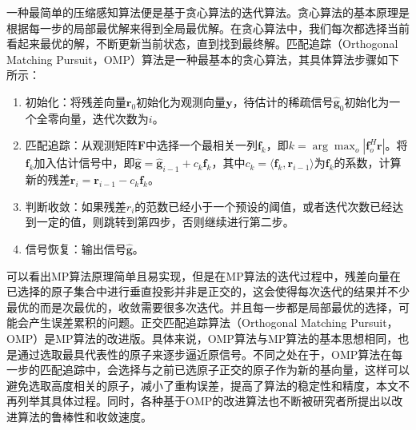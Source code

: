 \documentclass{xdupgthesis}
\begin{document}
一种最简单的压缩感知算法便是基于贪心算法的迭代算法。贪心算法的基本原理是根据每一步的局部最优解来得到全局最优解。在贪心算法中，我们每次都选择当前看起来最优的解，不断更新当前状态，直到找到最终解。匹配追踪（Orthogonal Matching Pursuit，OMP）算法是一种最基本的贪心算法，其具体算法步骤如下所示：
\begin{enumerate}
	\item 初始化：将残差向量$\mathbf{r}_0$初始化为观测向量$\mathbf{y}$，待估计的稀疏信号$\hat{\mathbf{g}}_0$初始化为一个全零向量，迭代次数为$i$。
	\item 匹配追踪：从观测矩阵$\mathbf{F}$中选择一个最相关一列$\mathbf{f}_k$，即$k = \arg \max_o |\mathbf{f}_o^H \mathbf{r}|$。将$\mathbf{f}_k$加入估计信号中，即$\hat{\mathbf{g}} = \hat{\mathbf{g}}_{i-1} + c_k \mathbf{f}_k$，其中$c_k = \langle \mathbf{f}_k, \mathbf{r}_{i-1} \rangle$为$\mathbf{f}_k$的系数，计算新的残差$\mathbf{r}_i = \mathbf{r}_{i-1} - c_k \mathbf{f}_k$。
	\item 判断收敛：如果残差$r_i$的范数已经小于一个预设的阈值，或者迭代次数已经达到一定的值，则跳转到第四步，否则继续进行第二步。
	\item 信号恢复：输出信号$\hat{\mathbf{g}}$。
\end{enumerate}
可以看出MP算法原理简单且易实现，但是在MP算法的迭代过程中，残差向量在已选择的原子集合中进行垂直投影并非是正交的，这会使得每次迭代的结果并不少最优的而是次最优的，收敛需要很多次迭代。并且每一步都是局部最优的选择，可能会产生误差累积的问题。正交匹配追踪算法（Orthogonal Matching Pursuit，OMP）是MP算法的改进版\parencite{OMP}。具体来说，OMP算法与MP算法的基本思想相同，也是通过选取最具代表性的原子来逐步逼近原信号。不同之处在于，OMP算法在每一步的匹配追踪中，会选择与之前已选原子正交的原子作为新的基向量，这样可以避免选取高度相关的原子，减小了重构误差，提高了算法的稳定性和精度，本文不再列举其具体过程。同时，各种基于OMP的改进算法也不断被研究者所提出\parencite{cosamp,stomp}以改进算法的鲁棒性和收敛速度。
\end{document}
